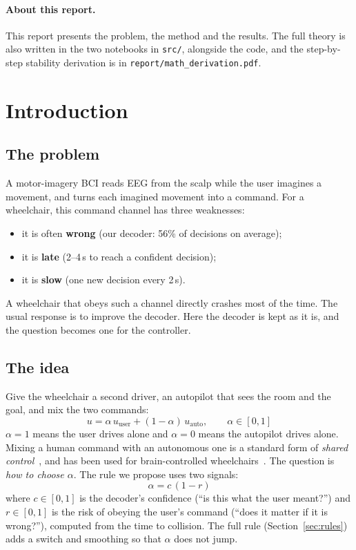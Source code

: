 \documentclass[11pt,a4paper]{article}
\newcommand{\code}[1]{\texttt{#1}}
\newcommand{\uu}{u_{\mathrm{user}}}
\newcommand{\ua}{u_{\mathrm{auto}}}
\begin{document}
\paragraph{About this report.} This report presents the problem, the
method and the results. The full theory is also written in the two
notebooks in \code{src/}, alongside the code, and the step-by-step
stability derivation is in \code{report/math\_derivation.pdf}.

\section{Introduction}

\subsection{The problem}
A motor-imagery BCI reads EEG from the scalp while the user imagines a
movement, and turns each imagined movement into a command. For a
wheelchair, this command channel has three weaknesses:
\begin{itemize}\setlength{\itemsep}{1pt}
\item it is often \textbf{wrong} (our decoder: 56\% of decisions on
average);
\item it is \textbf{late} (2--4\,s to reach a confident decision);
\item it is \textbf{slow} (one new decision every 2\,s).
\end{itemize}
A wheelchair that obeys such a channel directly crashes most of the
time. The usual response is to improve the decoder. Here the decoder is
kept as it is, and the question becomes one for the controller.

\subsection{The idea}
Give the wheelchair a second driver, an autopilot that sees the room and
the goal, and mix the two commands:
\begin{equation}
\boxed{\;u = \alpha\,\uu + (1-\alpha)\,\ua, \qquad \alpha \in [0,1]\;}
\label{eq:blend}
\end{equation}
$\alpha = 1$ means the user drives alone and $\alpha = 0$ means the
autopilot drives alone. Mixing a human command with an autonomous one is
a standard form of \emph{shared control}~\cite{dragan2013blending}, and
has been used for brain-controlled wheelchairs~\cite{carlson2013wheelchairs}.
The question is \emph{how to choose $\alpha$}. The rule we propose uses
two signals:
\begin{equation}
\boxed{\;\alpha = c\,(1 - r)\;}
\label{eq:adaptive-short}
\end{equation}
where $c \in [0,1]$ is the decoder's confidence (``is this what the user
meant?'') and $r \in [0,1]$ is the risk of obeying the user's command
(``does it matter if it is wrong?''), computed from the time to
collision. The full rule (Section~\ref{sec:rules}) adds a switch and
smoothing so that $\alpha$ does not jump.
\end{document}

